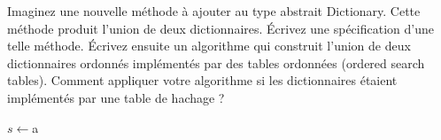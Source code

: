 Imaginez une nouvelle méthode à ajouter au type abstrait Dictionary. Cette méthode produit l’union de deux dictionnaires. Écrivez une spécification d’une telle méthode. Écrivez ensuite un algorithme qui construit l’union de deux dictionnaires ordonnés implémentés par des tables ordonnées (ordered search tables). Comment appliquer votre algorithme si les dictionnaires étaient implémentés par une table de hachage ?

\begin{algorithm}
\KwIn{}
$s \gets $a\;
\end{algorithm}
